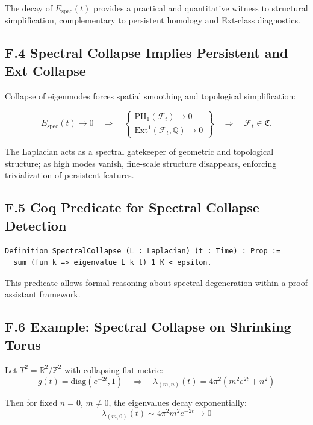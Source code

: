 \documentclass[11pt]{article}
\begin{document}
The decay of \( E_{\mathrm{spec}}(t) \) provides a practical and quantitative witness to structural simplification, complementary to persistent homology and Ext-class diagnostics.

\subsection{F.4 Spectral Collapse Implies Persistent and Ext Collapse}

Collapse of eigenmodes forces spatial smoothing and topological simplification:

\[
E_{\mathrm{spec}}(t) \to 0 \quad \Rightarrow \quad
\left\{
\begin{array}{l}
\mathrm{PH}_1(\mathcal{F}_t) \to 0 \\
\mathrm{Ext}^1(\mathcal{F}_t, \mathbb{Q}) \to 0
\end{array}
\right\} \quad \Rightarrow \quad \mathcal{F}_t \in \mathfrak{C}.
\]

The Laplacian acts as a spectral gatekeeper of geometric and topological structure; as high modes vanish, fine-scale structure disappears, enforcing trivialization of persistent features.

\subsection{F.5 Coq Predicate for Spectral Collapse Detection}

\begin{lstlisting}[language=Coq, caption=Spectral Collapse Predicate Definition]
Definition SpectralCollapse (L : Laplacian) (t : Time) : Prop :=
  sum (fun k => eigenvalue L k t) 1 K < epsilon.
\end{lstlisting}

This predicate allows formal reasoning about spectral degeneration within a proof assistant framework.

\subsection{F.6 Example: Spectral Collapse on Shrinking Torus}

Let \( T^2 = \mathbb{R}^2 / \mathbb{Z}^2 \) with collapsing flat metric:
\[
g(t) = \mathrm{diag}(e^{-2t}, 1)
\quad \Rightarrow \quad \lambda_{(m,n)}(t) = 4\pi^2 \left( m^2 e^{2t} + n^2 \right)
\]

Then for fixed \( n = 0 \), \( m \neq 0 \), the eigenvalues decay exponentially:
\[
\lambda_{(m,0)}(t) \sim 4\pi^2 m^2 e^{-2t} \to 0
\]
\end{document}
